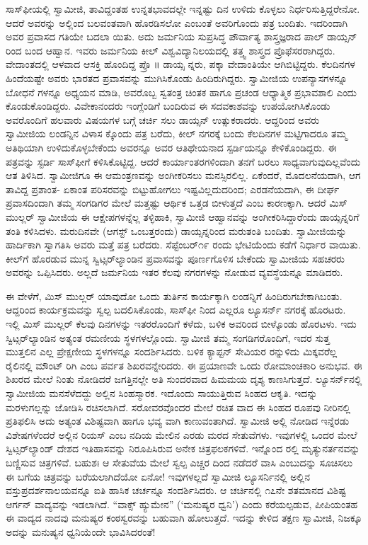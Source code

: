 ಸಾಸ್​ಫೀಯಲ್ಲಿ ಸ್ವಾಮೀಜಿ, ತಾವಿದ್ದಂತಹ ಉನ್ನತಭಾವದಲ್ಲೇ ಇನ್ನಷ್ಟು ದಿನ ಉಳಿದು ಕೊಳ್ಳಲು ನಿರ್ಧರಿಸುತ್ತಿದ್ದರೇನೋ. ಆದರೆ ಅವರನ್ನು ಅಲ್ಲಿಂದ ಬಲವಂತವಾಗಿ ಹೊರಡಿಸಲೋ ಎಂಬಂತೆ ಅವರಿಗೊಂದು ಪತ್ರ ಬಂದಿತು. ಇದರಿಂದಾಗಿ ಅವರ ಪ್ರವಾಸದ ಗತಿಯೇ ಬದಲಾ ಯಿತು. ಅದು ಜರ್ಮನಿಯ ಸುಪ್ರಸಿದ್ಧ ಪೌರ್ವಾತ್ಯ ಶಾಸ್ತ್ರಜ್ಞರಾದ ಪಾಲ್ ಡಾಯ್ಸನ್ ರಿಂದ ಬಂದ ಆಹ್ವಾನ. ಇವರು ಜರ್ಮನಿಯ ಕೀಲ್ ವಿಶ್ವವಿದ್ಯಾನಿಲಯದಲ್ಲಿ ತತ್ತ್ವ ಶಾಸ್ತ್ರದ ಪ್ರೊಫೆಸರರಾಗಿದ್ದರು. ವೇದಾಂತದಲ್ಲಿ ಆಳವಾದ ಆಸಕ್ತಿ ಹೊಂದಿದ್ದ ಪ್ರೊ ॥ ಡಾಯ್ಸ ನ್ನರು, ಪಕ್ಕಾ ವೇದಾಂತಿಯೇ ಆಗಿಬಿಟ್ಟಿದ್ದರು. ಕೆಲದಿನಗಳ ಹಿಂದೆಯಷ್ಟೇ ಅವರು ಭಾರತದ ಪ್ರವಾಸವನ್ನು ಮುಗಿಸಿಕೊಂಡು ಹಿಂದಿರುಗಿದ್ದರು. ಸ್ವಾಮೀಜಿಯ ಉಪನ್ಯಾಸಗಳನ್ನೂ ಬೋಧನೆ ಗಳನ್ನೂ ಅಧ್ಯಯನ ಮಾಡಿ, ಅವರೊಬ್ಬ ಸ್ವತಂತ್ರ ಚಿಂತಕ ಹಾಗೂ ಪ್ರಚಂಡ ಆಧ್ಯಾತ್ಮಿಕ ಪ್ರಭಾವಶಾಲಿ ಎಂದು ಕೊಂಡುಕೊಂಡಿದ್ದರು. ವಿವೇಕಾನಂದರು ಇಂಗ್ಲೆಂಡಿಗೆ ಬಂದಿರುವ ಈ ಸದವಕಾಶವನ್ನು ಉಪಯೋಗಿಸಿಕೊಂಡು ಅವರೊಂದಿಗೆ ಹಲವಾರು ವಿಷಯಗಳ ಬಗ್ಗೆ ಚರ್ಚಿ ಸಲು ಡಾಯ್ಸನ್ ಉತ್ಸುಕರಾದರು. ಆದ್ದರಿಂದ ಅವರು ಸ್ವಾಮೀಜಿಯ ಲಂಡನ್ನಿನ ವಿಳಾಸ ಕ್ಕೊಂದು ಪತ್ರ ಬರೆದು, ಕೀಲ್ ನಗರಕ್ಕೆ ಬಂದು ಕೆಲದಿನಗಳ ಮಟ್ಟಿಗಾದರೂ ತಮ್ಮ ಅತಿಥಿಯಾಗಿ ಉಳಿದುಕೊಳ್ಳಬೇಕೆಂದು ಅವರನ್ನೂ ಅವರ ಆತಿಥೇಯನಾದ ಸ್ಪರ್ಡಿಯನ್ನೂ ಕೇಳಿಕೊಂಡಿದ್ದರು. ಈ ಪತ್ರವನ್ನು ಸ್ಟರ್ಡಿ ಸಾಸ್​ಫೀಗೆ ಕಳಿಸಿಕೊಟ್ಟಿದ್ದ. ಆದರೆ ಕಾರ್ಯಾಂತರಗಳಿಂದಾಗಿ ತನಗೆ ಬರಲು ಸಾಧ್ಯವಾಗುವುದಿಲ್ಲವೆಂದು ಆತ ತಿಳಿಸಿದ. ಸ್ವಾಮೀಜಿಗೂ ಈ ಆಮಂತ್ರಣವನ್ನು ಅಂಗೀಕರಿಸಲು ಮನಸ್ಸಿರಲಿಲ್ಲ. ಏಕೆಂದರೆ, ಮೊದಲನೆಯದಾಗಿ, ಆಗ ತಾವಿದ್ದ ಪ್ರಶಾಂತ- ಏಕಾಂತ ಪರಿಸರವನ್ನು ಬಿಟ್ಟುಹೋಗಲು ಇಷ್ಟವಿಲ್ಲದುದರಿಂದ; ಎರಡನೆಯದಾಗಿ, ಈ ದೀರ್ಘ ಪ್ರವಾಸದಿಂದಾಗಿ ತಮ್ಮ ಸಂಗಡಿಗರ ಮೇಲೆ ಮತ್ತಷ್ಟು ಆರ್ಥಿಕ ಒತ್ತಡ ಬೀಳುತ್ತದೆ ಎಂಬ ಕಾರಣಕ್ಕಾಗಿ. ಆದರೆ ಮಿಸ್ ಮುಲ್ಲರ್ ಸ್ವಾಮೀಜಿಯ ಈ ಆಕ್ಷೇಪಗಳನ್ನೆಲ್ಲ ತಳ್ಳಿಹಾಕಿ, ಸ್ವಾಮೀಜಿ ಆಹ್ವಾನವನ್ನು ಅಂಗೀಕರಿಸಿದ್ದಾರೆಂದು ಡಾಯ್ಸನ್ನರಿಗೆ ತಂತಿ ಕಳಿಸಿದಳು. ಮರುದಿನವೇ (ಆಗಸ್ಟ್ ಒಂಬತ್ತರಂದು) ಡಾಯ್ಸನ್ನರಿಂದ ಮರುತಂತಿ ಬಂದಿತು. ಸ್ವಾಮೀಜಿಯನ್ನು ಹಾರ್ದಿಕಾಗಿ ಸ್ವಾಗತಿಸಿ ಅವರು ಮತ್ತೆ ಪತ್ರ ಬರೆದರು. ಸೆಪ್ಟೆಂಬರ್​೧೯ ರಂದು ಭೇಟಿಯೆಂದು ಕಡೆಗೆ ನಿರ್ಧಾರ ವಾಯಿತು. ಕೀಲ್​ಗೆ ಹೊರಡುವ ಮುನ್ನ ಸ್ವಿಟ್ಸರ್​ಲ್ಯಾಂಡಿನ ಪ್ರವಾಸವನ್ನು ಪೂರ್ಣಗೊಳಿಸ ಬೇಕೆಂದು ಸ್ವಾಮೀಜಿಯ ಸಹಚರರು ಅವರನ್ನು ಒಪ್ಪಿಸಿದರು. ಅಲ್ಲದೆ ಜರ್ಮನಿಯ ಇತರ ಕೆಲವು ನಗರಗಳನ್ನು ನೋಡುವ ವ್ಯವಸ್ಥೆಯನ್ನೂ ಮಾಡಿದರು.

ಈ ವೇಳೆಗೆ, ಮಿಸ್ ಮುಲ್ಲರ್ ಯಾವುದೋ ಒಂದು ತುರ್ತಿನ ಕಾರ್ಯಕ್ಕಾಗಿ ಲಂಡನ್ನಿಗೆ ಹಿಂದಿರುಗಬೇಕಾಗಿಬಂತು. ಆದ್ದರಿಂದ ಕಾರ್ಯಕ್ರಮವನ್ನು ಸ್ವಲ್ಪ ಬದಲಿಸಿಕೊಂಡು, ಸಾಸ್​ಫೀ ನಿಂದ ಎಲ್ಲರೂ ಲ್ಯೂಸರ್ನ್ ನಗರಕ್ಕೆ ಹೊರಟರು. ಇಲ್ಲಿ ಮಿಸ್ ಮುಲ್ಲರ್ ಕೆಲವು ದಿನಗಳನ್ನು ಇತರರೊಂದಿಗೆ ಕಳೆದು, ಬಳಿಕ ಅವರಿಂದ ಬೀಳ್ಕೊಂಡು ಹೊರಟಳು. ಇದು ಸ್ವಿಟ್ಸರ್​ಲ್ಯಾಂಡಿನ ಅತ್ಯಂತ ರಮಣೀಯ ಸ್ಥಳಗಳಲ್ಲೊಂದು. ಸ್ವಾಮೀಜಿ ತಮ್ಮ ಸಂಗಡಿಗರೊಂದಿಗೆ, ಇದರ ಸುತ್ತ ಮುತ್ತಲಿನ ಎಲ್ಲ ಪ್ರೇಕ್ಷಣೀಯ ಸ್ಥಳಗಳನ್ನೂ ಸಂದರ್ಶಿಸಿದರು. ಬಳಿಕ ಕ್ಯಾಪ್ಟನ್ ಸೇವಿಯರ ರನ್ನುಳಿದು ಮಿಕ್ಕವರೆಲ್ಲ ರೈಲಿನಲ್ಲಿ ಮೌಂಟ್ ರಿಗಿ ಎಂಬ ಪರ್ವತ ಶಿಖರವನ್ನೇರಿದರು. ಈ ಪ್ರಯಾಣವೇ ಒಂದು ರೋಮಾಂಚಕಾರಿ ಅನುಭವ. ಈ ಶಿಖರದ ಮೇಲೆ ನಿಂತು ನೋಡಿದರೆ ಜಗತ್ತಿನಲ್ಲೇ ಅತಿ ಸುಂದರವಾದ ಹಿಮಮಯ ದೃಶ್ಯ ಕಾಣಸಿಗುತ್ತದೆ. ಲ್ಯೂಸರ್ನ್​ನಲ್ಲಿ ಸ್ವಾಮೀಜಿಯ ಮನಸೆಳೆದದ್ದು ಅಲ್ಲಿನ ಸಿಂಹಸ್ಮಾರಕ. ಇದೊಂದು ಸಾಯುತ್ತಿರುವ ಸಿಂಹದ ಆಕೃತಿ. ಇದನ್ನು ಮರಳುಗಲ್ಲನ್ನು ಜೋಡಿಸಿ ರಚಿಸಲಾಗಿದೆ. ಸರೋವರವೊಂದರ ಮೇಲೆ ರಚಿತ ವಾದ ಈ ಸಿಂಹದ ರೂಪವು ನೀರಿನಲ್ಲಿ ಪ್ರತಿಫಲಿಸಿ ಅದು ಅತ್ಯಂತ ವಿಶಿಷ್ಟವಾಗಿ ಹಾಗೂ ಭವ್ಯ ವಾಗಿ ಕಾಣುವಂತಾಗಿದೆ. ಸ್ವಾಮೀಜಿ ಅಲ್ಲಿ ನೋಡಿದ ಇನ್ನೆರಡು ವಿಶೇಷಗಳೆಂದರೆ ಅಲ್ಲಿನ ರಿಯಸ್ ಎಂಬ ನದಿಯ ಮೇಲಿನ ಎರಡು ಮರದ ಸೇತುವೆಗಳು. ಇವುಗಳಲ್ಲಿ ಒಂದರ ಮೇಲೆ ಸ್ವಿಟ್ಸರ್​ಲ್ಯಾಂಡ್ ದೇಶದ ಇತಿಹಾಸವನ್ನು ನಿರೂಪಿಸಿರುವ ಅನೇಕ ಚಿತ್ರಫಲಕಗಳಿವೆ. ಇನ್ನೊಂದ ರಲ್ಲಿ ಮೃತ್ಯುನರ್ತನವನ್ನು ಬಣ್ಣಿಸುವ ಚಿತ್ರಗಳಿವೆ. ಬಹುಶಃ ಆ ಸೇತುವೆಯ ಮೇಲೆ ಸ್ವಲ್ಪ ಎಚ್ಚರ ದಿಂದ ನಡೆದರೆ ವಾಸಿ ಎಂಬುದನ್ನು ಸೂಚಿಸಲು ಈ ಬಗೆಯ ಚಿತ್ರವನ್ನು ಬರೆಯಲಾಗಿದೆಯೋ ಏನೋ! ಇವುಗಳಲ್ಲದೆ ಸ್ವಾಮೀಜಿ ಲ್ಯೂಸರ್ನಿನಲ್ಲಿ ಅಲ್ಲಿನ ವಸ್ತುಪ್ರದರ್ಶನಾಲಯವನ್ನೂ ಐತಿ ಹಾಸಿಕ ಚರ್ಚನ್ನೂ ಸಂದರ್ಶಿಸಿದರು. ಆ ಚರ್ಚಿನಲ್ಲಿ ೧೭ನೇ ಶತಮಾನದ ವಿಶಿಷ್ಟ ಆರ್ಗನ್ ವಾದ್ಯವನ್ನು ಇಡಲಾಗಿದೆ. “ವಾಕ್ಸ್ ಹ್ಯುಮೇನ” (‘ಮನುಷ್ಯರ ಧ್ವನಿ’) ಎಂದು ಕರೆಯಲ್ಪಡುವ, ಪೀಪಿಯಂತಹ ಈ ವಾದ್ಯದ ನಾದವು ಮನುಷ್ಯರ ಕಂಠಸ್ವರವನ್ನು ಬಹುವಾಗಿ ಹೋಲುತ್ತದೆ. ಇದನ್ನು ಕೇಳಿದ ತಕ್ಷಣ ಸ್ವಾಮೀಜಿ, ನಿಜಕ್ಕೂ ಅದನ್ನು ಮನುಷ್ಯನ ಧ್ವನಿಯೆಂದೇ ಭಾವಿಸಿದರಂತೆ!

